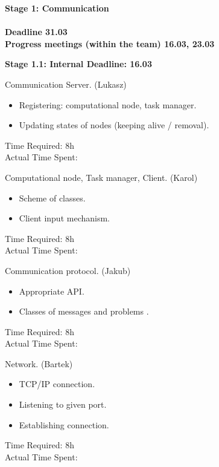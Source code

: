 \documentclass{article}
\begin{document}
\begin{itemize}
{\item \large \bf Stage 1: Communication \\ \\ 
	Deadline 31.03 \\
	Progress meetings (within the team) 16.03, 23.03 }
	
	\begin{itemize}

			{\item \large \bf Stage 1.1: Internal Deadline: 16.03 }
			
			\begin{enumerate}
			
					{\bf \item Communication Server. (Lukasz) }
					\begin{itemize} [label=$\bullet$]
							\item Registering: computational node,
							 task manager.
							\item Updating states of nodes (keeping alive / removal).		
					\end{itemize}
					Time Required: 8h \\ 
					Actual Time Spent: \\
					
					{\bf \item Computational node, Task manager, Client. (Karol)}
					\begin{itemize} [label=$\bullet$]
							\item Scheme of classes.
							\item Client input mechanism.
					\end{itemize}		
					Time Required: 8h \\ 
					Actual Time Spent: \\
			
			
					{\bf \item Communication protocol. (Jakub)}
					\begin{itemize} [label=$\bullet$]
							\item Appropriate API.
							\item Classes of messages and problems	.
					\end{itemize}
					Time Required: 8h \\ 
					Actual Time Spent: \\
			
			
					{\bf \item Network. (Bartek) }
					\begin{itemize} [label=$\bullet$]
							\item TCP/IP connection.
							\item Listening to given port.
							\item Establishing connection.
					\end{itemize}
					Time Required: 8h \\ 
					Actual Time Spent: \\
			

\end{enumerate}
\end{itemize}
\end{itemize}
\end{document}
